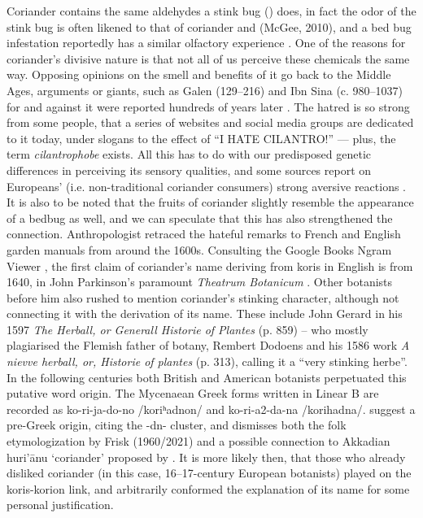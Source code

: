 Coriander contains the same aldehydes a stink bug () does, in fact the odor of the stink bug is often likened to that of coriander and (McGee, 2010), and a bed bug infestation reportedly has a similar olfactory experience \parencite{davidson_oxford_2014}. One of the reasons for coriander’s divisive nature is that not all of us perceive these chemicals the same way. Opposing opinions on the smell and benefits of it go back to the Middle Ages, arguments or giants, such as Galen (129--216) and Ibn Sina (c. 980--1037) for and against it were reported hundreds of years later \parencite[cf.][]{parkinson_theatrum_1640}. The hatred is so strong from some people, that a series of websites and social media groups are dedicated to it today, under slogans to the effect of “I HATE CILANTRO!” — plus, the term \emph{cilantrophobe} exists. All this has to do with our predisposed genetic differences in perceiving its sensory qualities, and some sources report on Europeans’ (i.e. non-traditional coriander consumers) strong aversive reactions \parencite{eriksson_genetic_2012}. It is also to be noted that the fruits of coriander slightly resemble the appearance of a bedbug as well, and we can speculate that this has also strengthened the connection. Anthropologist \textcite{leach_rehabilitating_2001} retraced the hateful remarks to French and English garden manuals from around the 1600s.
Consulting the Google Books Ngram Viewer \parencite{michel_quantitative_2011}, the first claim of coriander’s name deriving from koris in English is from 1640, in John Parkinson’s paramount \textit{Theatrum Botanicum} \parencite[918-919]{parkinson_theatrum_1640}. Other botanists before him also rushed to mention coriander’s stinking character, although not connecting it with the derivation of its name. These include John Gerard in his 1597 \textit{The Herball, or Generall Historie of Plantes} (p. 859) – who mostly plagiarised the Flemish father of botany, Rembert Dodoens and his 1586 work \textit{A nievve herball, or, Historie of plantes} (p. 313), calling it a “very stinking herbe”. In the following centuries both British and American botanists perpetuated this putative word origin. The Mycenaean Greek forms written in Linear B are recorded as ko-ri-ja-do-no /koriʰadnon/ and ko-ri-a2-da-na /korihadna/. \textcite[754]{beekes_etymological_2010} suggest a pre-Greek origin, citing the -dn- cluster, and dismisses both the folk etymologization by \textcite{frisk_griechisches_2021} Frisk (1960/2021) and a possible connection to Akkadian huri’ānu ‘coriander’ proposed by \textcite{szemerenyi_review_1971}. It is more likely then, that those who already disliked coriander (in this case, 16--17-century European botanists) played on the koris-korion link, and arbitrarily conformed the explanation of its name for some personal justification.
